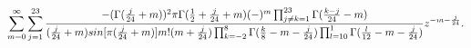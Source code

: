 \begin{equation}
\label{eq:sol3largez}
\sum_{m=0}^\infty\sum_{j=1}^{23}{-(\Gamma({j\over24}+m))^2\pi\Gamma({1\over2}+{j\over24}+m)
(-)^m\prod_{j\neq k=1}^{23}
\Gamma({k-j\over24}-m)\over ({j\over24}+m)sin[\pi({j\over24}+m)]m!(m+{j\over24})\prod_{k=-2}^8\Gamma
({k\over8}-m-{j\over24})\prod_{l=10}^1\Gamma({l\over12}-m-{j\over24})}z^{-m-{j\over24}}.
\end{equation}

